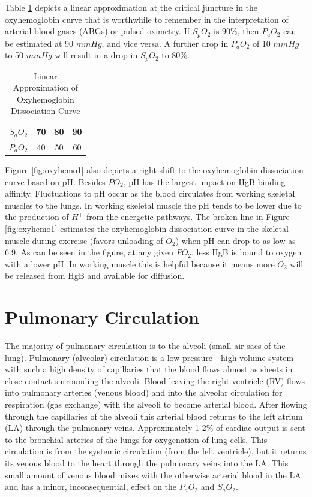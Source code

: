 Table \ref{table:oxyhemo} depicts a linear approximation at the critical juncture in the oxyhemoglobin curve that is worthwhile to remember in the interpretation of arterial blood gases (ABGs) or pulsed oximetry. If $S_pO_2$ is 90\%, then $P_aO_2$ can be estimated at 90 $mmHg$, and vice versa. A further drop in $P_aO_2$ of 10 $mmHg$ to 50 $mmHg$ will result in a drop in $S_pO_2$ to 80\%.

\begin{table}[h!]
\centering
\begin{tabular}{||c|c|c|c||} 
 \hline
 $S_aO_2$ & 70 & 80 & 90 \\ 
 \hline
 $P_aO_2$ & 40 & 50 & 60 \\[1ex] 
 \hline
\end{tabular}
\caption{Linear Approximation of Oxyhemoglobin Dissociation Curve}
\label{table:oxyhemo}
\end{table}

Figure \ref{fig:oxyhemo1} also depicts a right shift to the oxyhemoglobin dissociation curve based on pH. Besides $PO_2$, pH has the largest impact on HgB binding affinity. Fluctuations to pH occur as the blood circulates from working skeletal muscles to the lungs. In working skeletal muscle the pH tends to be lower due to the production of $H^+$ from the energetic pathways. The broken line in Figure \ref{fig:oxyhemo1} estimates the oxyhemoglobin dissociation curve in the skeletal muscle during exercise (favors unloading of $O_2$) when pH can drop to as low as 6.9. As can be seen in the figure, at any given $PO_2$, less HgB is bound to oxygen with a lower pH. In working muscle this is helpful because it means more $O_2$ will be released from HgB and available for diffusion.


\section{Pulmonary Circulation}

The majority of pulmonary circulation is to the alveoli (small air sacs of the lung). Pulmonary (alveolar) circulation is a low pressure - high volume system with such a high density of capillaries that the blood flows almost as sheets in close contact surrounding the alveoli. Blood leaving the right ventricle (RV) flows into pulmonary arteries (venous blood) and into the alveolar circulation for respiration (gas exchange) with the alveoli to become arterial blood. After flowing through the capillaries of the alveoli this arterial blood returns to the left atrium (LA) through the pulmonary veins. 
Approximately 1-2\% of cardiac output is sent to the bronchial arteries of the lungs for oxygenation of lung cells. This circulation is from the systemic circulation (from the left ventricle), but it returns its venous blood to the heart through the pulmonary veins into the LA. This small amount of venous blood mixes with the otherwise arterial blood in the LA and has a minor, inconsequential, effect on the $P_aO_2$ and $S_aO_2$.

